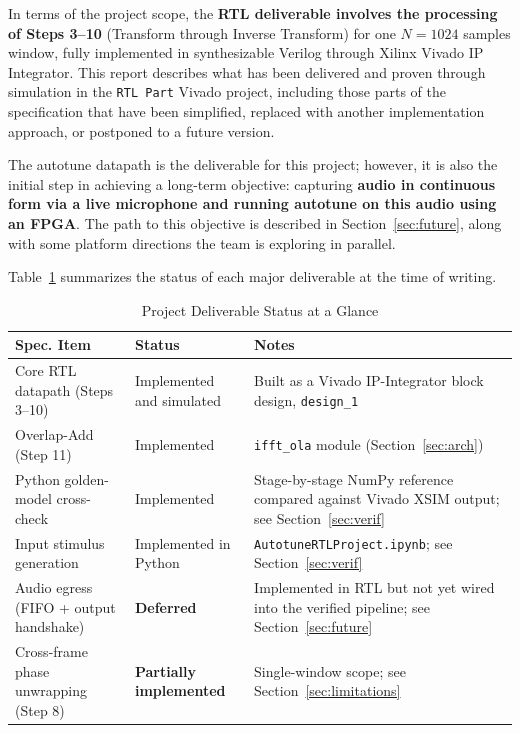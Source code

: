 \documentclass[conference,a4paper]{IEEEtran}
\begin{document}
In terms of the project scope, the \textbf{RTL deliverable involves the processing of Steps 3--10} (Transform through Inverse Transform) for one $N = 1024$ samples window, fully implemented in synthesizable Verilog through Xilinx Vivado IP Integrator. This report describes what has been delivered and proven through simulation in the \texttt{RTL Part} Vivado project, including those parts of the specification that have been simplified, replaced with another implementation approach, or postponed to a future version.

The autotune datapath is the deliverable for this project; however, it is also the initial step
in achieving a long-term objective: capturing \textbf{audio in continuous form via a live
microphone and running autotune on this audio using an FPGA}. The path to this objective is
described in Section~\ref{sec:future}, along with some platform directions the team is
exploring in parallel.

Table~\ref{tab:status} summarizes the status of each major deliverable at the time of
writing.

\begin{table}[!t]
\centering
\caption{Project Deliverable Status at a Glance}
\label{tab:status}
\begin{tabular}{p{4.2cm}p{2.6cm}p{9.8cm}}
\toprule
\textbf{Spec. Item} & \textbf{Status} & \textbf{Notes} \\
\midrule
Core RTL datapath (Steps 3--10) & Implemented and simulated & Built as a Vivado IP-Integrator block design, \texttt{design\_1} \\
Overlap-Add (Step 11) & Implemented & \texttt{ifft\_ola} module (Section~\ref{sec:arch}) \\
Python golden-model cross-check & Implemented & Stage-by-stage NumPy reference compared against Vivado XSIM output; see Section~\ref{sec:verif} \\
Input stimulus generation & Implemented in Python & \texttt{AutotuneRTLProject.ipynb}; see Section~\ref{sec:verif} \\
Audio egress (FIFO + output handshake) & \textbf{Deferred} & Implemented in RTL but not yet wired into the verified pipeline; see Section~\ref{sec:future} \\
Cross-frame phase unwrapping (Step 8) & \textbf{Partially implemented} & Single-window scope; see Section~\ref{sec:limitations} \\
\bottomrule
\end{tabular}
\end{table}
\end{document}
